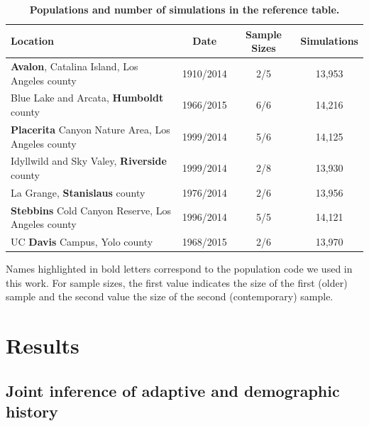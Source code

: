 \documentclass[a4paper, 12pt]{article}
\begin{document}
\begin{table}[!ht]
\small
 \caption{\textbf{Populations and number of simulations in the reference table.}}
  \centering
  \begin{tabular}{lccc}
   \cmidrule(r){1-4}
    Location                                                  &Date      &Sample Sizes   &Simulations \\
    \midrule               
    \textbf{Avalon}, Catalina Island, Los Angeles county      &1910/2014 &2/5 &13,953      \\ 
    Blue Lake and Arcata, \textbf{Humboldt} county            &1966/2015 &6/6 &14,216      \\ 
    \textbf{Placerita} Canyon Nature Area, Los Angeles county &1999/2014 &5/6 &14,125      \\ 
    Idyllwild and Sky Valey, \textbf{Riverside} county        &1999/2014 &2/8 &13,930      \\ 
    La Grange, \textbf{Stanislaus} county                     &1976/2014 &2/6 &13,956      \\ 
    \textbf{Stebbins} Cold Canyon Reserve, Los Angeles county &1996/2014 &5/5 &14,121      \\ 
    UC \textbf{Davis} Campus, Yolo county                     &1968/2015 &2/6 &13,970      \\ 
    \bottomrule
  \end{tabular}
  \begin{tablenotes}
      \footnotesize
      \item Names highlighted in bold letters correspond to the population code we used in this work. For sample sizes, the first value indicates the size of the first (older) sample and the second value the size of the second (contemporary) sample.

  \end{tablenotes}
  \label{tab:feralbees}
\end{table}



\section*{Results}

\subsection*{Joint inference of adaptive and demographic history}
\end{document}
